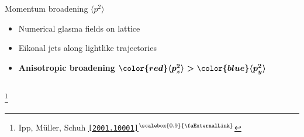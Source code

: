 \documentclass[aspectratio=169,11pt,usenames,dvipsnames]{beamer}
\renewcommand{\thefootnote}{\color{customblue}\faPaperPlaneO}
\newcommand\blfootnote[1]{%
  \begingroup
  \renewcommand\thefootnote{}\footnote{#1}%
  \addtocounter{footnote}{-1}%
  \endgroup
}
\begin{document}
\begin{frame}[t]
\begin{columns}[onlytextwidth,t]
        \begin{center}
            {\Large\color{isgold} Momentum broadening $\langle p^2\rangle$ \\[10pt]}
            \footnotesize
                \begin{itemize}
                    \item {\color{lightgray}Numerical glasma fields on lattice}
                    \item {\color{lightgray} Eikonal jets along lightlike trajectories}\\[15pt]
                    \item {\color{destacado}\bfseries\normalsize Anisotropic broadening $\boldsymbol{{\color{red}\langle p^2_z\rangle}>{\color{blue}\langle p^2_y\rangle}}$}
                \end{itemize}
        \end{center}
    \end{columns}
    \blfootnote{\scriptsize Ipp, Müller, Schuh \href{https://arxiv.org/abs/2001.10001}{\color{palgold}\texttt{[2001.10001]}$^\text{\scalebox{0.9}{\faExternalLink}}$}}
\end{frame}

\end{document}
